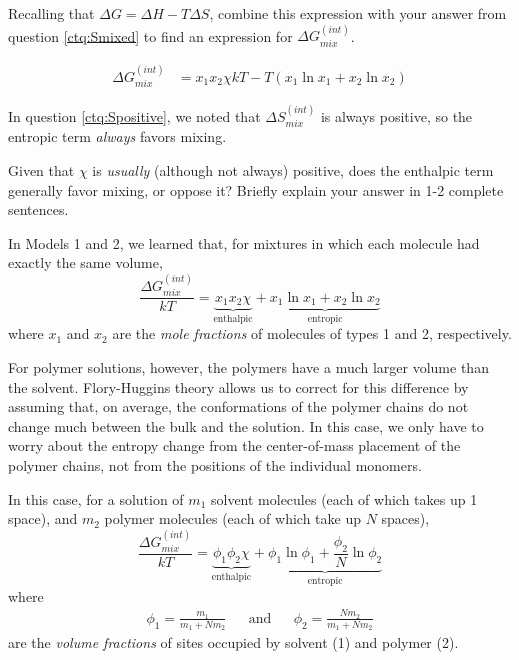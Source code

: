 \begin{activity}
\begin{infobox}
\end{infobox}
	
\begin{ctqs}
		\question Recalling that $\Delta G = \Delta H - T\Delta S$, combine this expression with your answer from question \ref{ctq:Smixed} to find an expression for $\Delta G_{mix}^{(int)}$.
			
			\begin{solution}[1in]
				\begin{align*}
					\Delta G_{mix}^{(int)} &= x_1 x_2 \chi kT - T(x_1 \ln x_1 + x_2 \ln x_2)
				\end{align*}
			\end{solution}
			
		\question In question \ref{ctq:Spositive}, we noted that $\Delta S_{mix}^{(int)}$ is always positive, so the entropic term \emph{always} favors mixing.
		
			Given that $\chi$ is \emph{usually} (although not always) positive, does the enthalpic term generally favor mixing, or oppose it?  Briefly explain your answer in 1-2 complete sentences.
			
			\begin{solution}[1in]
			\end{solution}
\end{ctqs}

\begin{model}

In Models 1 and 2, we learned that, for mixtures in which each molecule had exactly the same volume,
\begin{equation*}
	\frac{\Delta G_{mix}^{(int)}}{kT} = \underbrace{x_1 x_2 \chi}_{\text{enthalpic}} + \underbrace{x_1 \ln x_1 + x_2 \ln x_2}_{\text{entropic}}
\end{equation*}
where $x_1$ and $x_2$ are the \emph{mole fractions} of molecules of types 1 and 2, respectively.

For polymer solutions, however, the polymers have a much larger volume than the solvent.  Flory-Huggins theory allows us to correct for this difference by assuming that, on average, the conformations of the polymer chains do not change much between the bulk and the solution. In this case, we only have to worry about the entropy change from the center-of-mass placement of the polymer chains, not from the positions of the individual monomers.

In this case, for a solution of $m_1$ solvent molecules (each of which takes up 1 space), and $m_2$ polymer molecules (each of which take up $N$ spaces),  
\begin{equation*}
	\frac{\Delta G_{mix}^{(int)}}{kT} = \underbrace{\phi_1 \phi_2 \chi}_{\text{enthalpic}} + \underbrace{\phi_1 \ln \phi_1 + \frac{\phi_2}{N} \ln \phi_2}_{\text{entropic}}
\end{equation*}
where
\begin{align*}
	\phi_1 = \frac{m_1}{m_1 + N m_2} && \text{and} && \phi_2 = \frac{N m_2}{m_1 + N m_2}
\end{align*}
are the \emph{volume fractions} of sites occupied by solvent (1) and polymer (2).
\end{model}


\end{activity}
